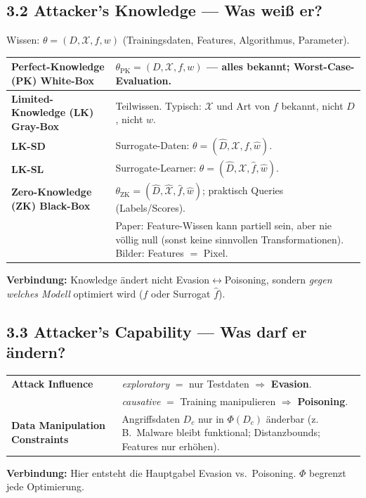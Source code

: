 \documentclass[10pt,a4paper]{article}
\begin{document}
\subsection{3.2 Attacker's Knowledge --- Was wei\ss{} er?}
Wissen: $\theta=(D,\mathcal{X},f,w)$ (Trainingsdaten, Features, Algorithmus, Parameter).

\begin{tabularx}{\textwidth}{@{}>{\bfseries\small}l >{\small}X@{}}
\toprule
Perfect-Knowledge (PK) White-Box &
  $\theta_{\mathrm{PK}}=(D,\mathcal{X},f,w)$ --- alles bekannt; Worst-Case-Evaluation.\\
\midrule
Limited-Knowledge (LK) Gray-Box &
  Teilwissen. Typisch: $\mathcal{X}$ und Art von $f$ bekannt, nicht $D$, nicht $w$.\\
\quad LK-SD & Surrogate-Daten: $\theta=(\hat D,\mathcal{X},f,\hat w)$.\\
\quad LK-SL & Surrogate-Learner: $\theta=(\hat D,\mathcal{X},\hat f,\hat w)$.\\
\midrule
Zero-Knowledge (ZK) Black-Box &
  $\theta_{\mathrm{ZK}}=(\hat D,\hat{\mathcal{X}},\hat f,\hat w)$; praktisch Queries (Labels/Scores).\\
  & Paper: Feature-Wissen kann partiell sein, aber nie v\"ollig null
  (sonst keine sinnvollen Transformationen). Bilder: Features $=$ Pixel.\\
\bottomrule
\end{tabularx}
\vspace{0.1em}
{\small\textbf{Verbindung:} Knowledge \"andert nicht Evasion$\leftrightarrow$Poisoning, sondern
\emph{gegen welches Modell} optimiert wird ($f$ oder Surrogat $\hat f$).}

\subsection{3.3 Attacker's Capability --- Was darf er \"andern?}
\begin{tabularx}{\textwidth}{@{}>{\bfseries\small}l >{\small}X@{}}
\toprule
Attack Influence &
  \emph{exploratory} $=$ nur Testdaten $\Rightarrow$ \textbf{Evasion}.\\
  & \emph{causative} $=$ Training manipulieren $\Rightarrow$ \textbf{Poisoning}.\\
\midrule
Data Manipulation Constraints &
  Angriffsdaten $D_c$ nur in $\Phi(D_c)$ \"anderbar
  (z.\,B.\ Malware bleibt funktional; Distanzbounds; Features nur erh\"ohen).\\
\bottomrule
\end{tabularx}
\vspace{0.1em}
{\small\textbf{Verbindung:} Hier entsteht die Hauptgabel Evasion vs.\ Poisoning. $\Phi$ begrenzt jede Optimierung.}
\end{document}
